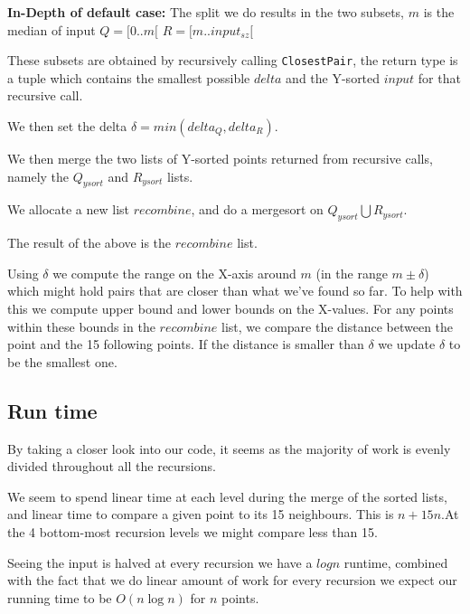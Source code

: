 \documentclass{tufte-handout}
\begin{document}
\bigskip
\textbf{In-Depth of default case:}\newline
The split we do results in the two subsets, $m$ is the median of input\newline
  $Q = \lbrack 0 .. m \lbrack $\newline
  $R = \lbrack m .. input_{sz} \lbrack$ \newline 

These subsets are obtained by recursively calling \verb+ClosestPair+, the return type 
is a tuple which contains the smallest possible $delta$ and the Y-sorted $input$ for that recursive call.

We then set the delta $\delta = min(delta_{Q}, delta_{R})$.\newline

We then merge the two lists of Y-sorted points returned from recursive calls, namely the $Q_{ysort}$ and $R_{ysort}$ lists.

We allocate a new list $recombine$, and do a mergesort on \newline $Q_{y sort} \bigcup R_{y sort}$.


The result of the above is the $recombine$ list.\newline

Using $\delta$ we compute the range on the X-axis around $m$ (in the range $m \pm \delta$) which 
might hold pairs that are closer than what we've found so far.
To help with this we compute upper bound and lower bounds on the X-values.\newline
For any points within these bounds in the $recombine$ list, we compare the distance between the point
 and the 15 following points.
If the distance is smaller than $\delta$ we update $\delta$ to be the smallest one.

\subsection{Run time}
By taking a closer look into our code, it seems as the majority of work is evenly divided throughout all the recursions.

We seem to spend linear time at each level during the merge of the sorted lists, and linear time to 
compare a given point to its 15 neighbours.
This is $n + 15n$.\newline At the 4 bottom-most recursion levels we might compare less than 15.

Seeing the input is halved at every recursion we have a $log n$ runtime, combined with the fact that we 
do linear amount of work for every recursion we expect our running time to be $O(n\log n)$ for $n$ points.
\end{document}
